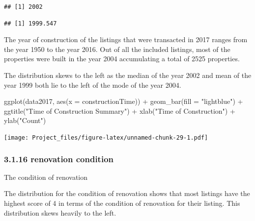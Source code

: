 \documentclass[
]{article}
\newenvironment{Shaded}{\begin{snugshade}}{\end{snugshade}}
\newcommand{\AttributeTok}[1]{\textcolor[rgb]{0.77,0.63,0.00}{#1}}
\newcommand{\FunctionTok}[1]{\textcolor[rgb]{0.00,0.00,0.00}{#1}}
\newcommand{\NormalTok}[1]{#1}
\newcommand{\SpecialCharTok}[1]{\textcolor[rgb]{0.00,0.00,0.00}{#1}}
\newcommand{\StringTok}[1]{\textcolor[rgb]{0.31,0.60,0.02}{#1}}
\begin{document}
\begin{verbatim}
## [1] 2002
\end{verbatim}

\begin{Shaded}
\end{Shaded}

\begin{verbatim}
## [1] 1999.547
\end{verbatim}

The year of construction of the listings that were transacted in 2017
ranges from the year 1950 to the year 2016. Out of all the included
listings, most of the properties were built in the year 2004
accumulating a total of 2525 properties.

The distribution skews to the left as the median of the year 2002 and
mean of the year 1999 both lie to the left of the mode of the year 2004.

\begin{Shaded}
\begin{Highlighting}[]
\FunctionTok{ggplot}\NormalTok{(data2017, }\FunctionTok{aes}\NormalTok{(}\AttributeTok{x =}\NormalTok{ constructionTime)) }\SpecialCharTok{+}
  \FunctionTok{geom\_bar}\NormalTok{(}\AttributeTok{fill =} \StringTok{"lightblue"}\NormalTok{) }\SpecialCharTok{+}
  \FunctionTok{ggtitle}\NormalTok{(}\StringTok{"Time of Construction Summary"}\NormalTok{) }\SpecialCharTok{+}
  \FunctionTok{xlab}\NormalTok{(}\StringTok{"Time of Construction"}\NormalTok{) }\SpecialCharTok{+}
  \FunctionTok{ylab}\NormalTok{(}\StringTok{"Count"}\NormalTok{)}
\end{Highlighting}
\end{Shaded}

\texttt{[image: Project\_files/figure-latex/unnamed-chunk-29-1.pdf]}

\hypertarget{renovation-condition}{%
\subsubsection{3.1.16 renovation condition}\label{renovation-condition}}

The condition of renovation

The distribution for the condition of renovation shows that most
listings have the highest score of 4 in terms of the condition of
renovation for their listing. This distribution skews heavily to the
left.
\end{document}
